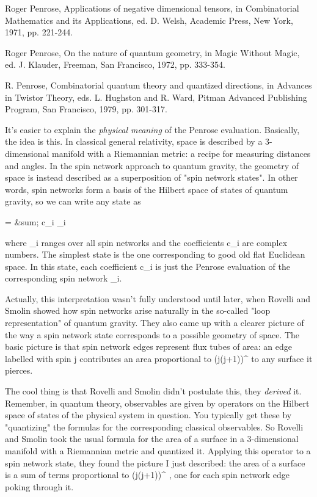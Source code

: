 Roger Penrose, Applications of negative dimensional tensors, in 
Combinatorial Mathematics and its Applications, ed. D. Welsh,
Academic Press, New York, 1971, pp. 221-244.

Roger Penrose, On the nature of quantum geometry, in Magic Without
Magic, ed. J. Klauder, Freeman, San Francisco, 1972, pp. 333-354.

R. Penrose, Combinatorial quantum theory and quantized directions, in
Advances in Twistor Theory, eds. L. Hughston and R. Ward,
Pitman Advanced Publishing Program, San Francisco, 1979, pp. 301-317.



It's easier to explain the \emph{physical meaning} of the Penrose evaluation.
Basically, the idea is this.  In classical general relativity, space is
described by a 3-dimensional manifold with a Riemannian metric: a recipe
for measuring distances and angles.  In the spin network approach to
quantum gravity, the geometry of space is instead described as a
superposition of "spin network states".  In other words, spin networks
form a basis of the Hilbert space of states of quantum gravity, so we
can write any state \Psi  as

                         \Psi  = &sum; c_{i} \psi _{i}

where \psi _{i} ranges over all spin networks and the
coefficients c_{i} are complex numbers.  The simplest state is
the one corresponding to good old flat Euclidean space.  In this state,
each coefficient c_{i} is just the Penrose evaluation of the 
corresponding spin network \psi _{i}.

Actually, this interpretation wasn't fully understood until later, when
Rovelli and Smolin showed how spin networks arise naturally in the
so-called "loop representation" of quantum gravity.  They also came up
with a clearer picture of the way a spin network state corresponds to a
possible geometry of space.  The basic picture is that spin network
edges represent flux tubes of area: an edge labelled with spin j
contributes an area proportional to (j(j+1))^{ } to any surface it
pierces.  

The cool thing is that Rovelli and Smolin didn't postulate this, they
\emph{derived} it.  Remember, in quantum theory, observables are given by
operators on the Hilbert space of states of the physical system in
question.  You typically get these by "quantizing" the formulas for the
corresponding classical observables.  So Rovelli and Smolin took the
usual formula for the area of a surface in a 3-dimensional manifold with
a Riemannian metric and quantized it.  Applying this operator to a spin
network state, they found the picture I just described: the area of a
surface is a sum of terms proportional to (j(j+1))^{ }, 
one for each
spin network edge poking through it.

